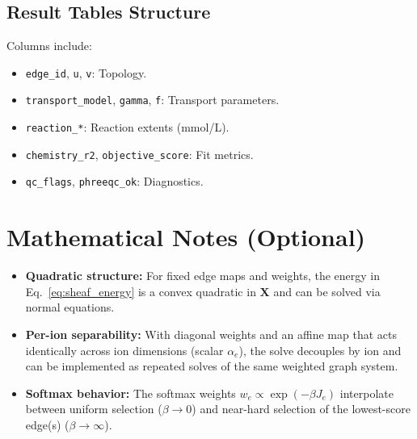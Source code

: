 \documentclass[12pt,a4paper]{article}
\theoremstyle{plain}
\theoremstyle{definition}
\theoremstyle{remark}
\begin{document}
\subsection{Result Tables Structure}\label{sec:result_tables}
Columns include:
\begin{itemize}
	\item \texttt{edge\_id}, \texttt{u}, \texttt{v}: Topology.
	\item \texttt{transport\_model}, \texttt{gamma}, \texttt{f}: Transport parameters.
	\item \texttt{reaction\_*}: Reaction extents (mmol/L).
	\item \texttt{chemistry\_r2}, \texttt{objective\_score}: Fit metrics.
	\item \texttt{qc\_flags}, \texttt{phreeqc\_ok}: Diagnostics.
\end{itemize}

\newpage

\appendix

\section{Mathematical Notes (Optional)}\label{sec:math_notes}
\begin{itemize}
	\item \textbf{Quadratic structure:} For fixed edge maps and weights, the energy in Eq.~\ref{eq:sheaf_energy} is a convex quadratic in $\mathbf{X}$ and can be solved via normal equations.
	\item \textbf{Per-ion separability:} With diagonal weights and an affine map that acts identically across ion dimensions (scalar $\alpha_e$), the solve decouples by ion and can be implemented as repeated solves of the same weighted graph system.
	\item \textbf{Softmax behavior:} The softmax weights $w_e\propto \exp(-\beta J_e)$ interpolate between uniform selection ($\beta\to 0$) and near-hard selection of the lowest-score edge(s) ($\beta\to\infty$).
\end{itemize}
\end{document}
